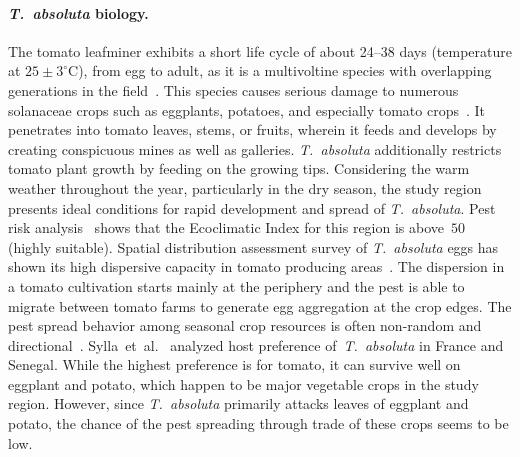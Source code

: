 \documentclass[11pt]{article}
\newcommand{\tuta}{\emph{T.~absoluta}}
\newcommand{\aacomment}[1]{({\color{magenta}AA: #1})}
\newcommand{\veg}{\mathrm{V}}
\newcommand{\temp}{\mathrm{T}}
\newcommand{\consume}{\mathrm{Pop}}
\theoremstyle{definition}
\begin{document}
\paragraph{\tuta{} biology.}
The tomato leafminer exhibits a short life cycle of about 24--38 days
(temperature at $25\pm3^\circ$C), from egg to adult, as it is a
multivoltine species with overlapping generations in the
field~\cite{guedes2012tomato}. This species causes serious damage to
numerous solanaceae crops such as eggplants, potatoes, and especially
tomato crops~\cite{sylla2018}. It penetrates into tomato leaves, stems, or
fruits, wherein it feeds and develops by creating conspicuous mines as well
as galleries. \tuta{} additionally restricts tomato plant growth by feeding
on the growing tips. Considering the warm weather throughout the year,
particularly in the dry season, the study region presents ideal conditions
for rapid development and spread of \tuta{}. Pest risk
analysis~\cite{tonnang2015identification} shows that the Ecoclimatic Index
for this region is above~$50$ (highly suitable). Spatial distribution
assessment survey of \tuta{} eggs has shown its high dispersive capacity in
tomato producing areas~\cite{martins2018assessing}. The dispersion in a
tomato cultivation starts mainly at the periphery and
the pest is able to migrate between tomato farms to generate egg aggregation at the
crop edges. The pest spread behavior among seasonal crop resources
is often non-random and directional~\cite{martins2018assessing}.
Sylla~et~al.~\cite{sylla2018} analyzed host preference of~\tuta{} in France
and Senegal. While the highest preference is for tomato, it can survive
well on eggplant and potato, which happen to be major vegetable crops in
the study region. However, since \tuta{} primarily attacks leaves of
eggplant and potato, the chance of the pest spreading through trade of
these crops seems to be low.
\end{document}
